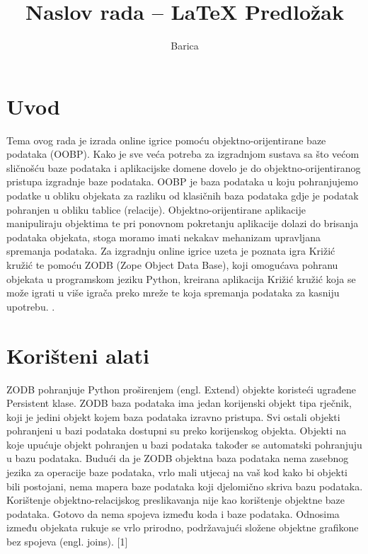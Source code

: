 \documentclass[]{foi} %
\title{Naslov rada -- LaTeX Predložak}
\author{Barica} %
\begin{document}
\maketitle

\tableofcontents

\makeatletter {} \makeatother
\pagestyle{plain}



\chapter{Uvod}

Tema ovog rada je izrada online igrice pomoću objektno-orijentirane baze podataka (OOBP). Kako je sve veća potreba za izgradnjom sustava sa što većom sličnošću baze podataka i aplikacijske domene dovelo je do objektno-orijentiranog pristupa izgradnje baze podataka. OOBP je baza podataka u koju pohranjujemo podatke u obliku objekata za razliku od klasičnih baza podataka gdje je podatak pohranjen u obliku tablice (relacije). Objektno-orijentirane aplikacije manipuliraju objektima te pri ponovnom pokretanju aplikacije dolazi do brisanja podataka objekata, stoga moramo imati nekakav mehanizam upravljana spremanja podataka. Za izgradnju online igrice uzeta je poznata igra Križić kružić te pomoću ZODB (Zope Object Data Base), koji omogućava pohranu objekata u programskom jeziku Python, kreirana aplikacija Križić kružić koja se može igrati u više igrača preko mreže te koja spremanja podataka za kasniju upotrebu. 
.



\chapter{Korišteni alati}

ZODB pohranjuje Python proširenjem (engl. Extend) objekte koristeći ugrađene Persistent klase. ZODB baza podataka ima jedan korijenski objekt tipa rječnik, koji je jedini objekt kojem baza podataka izravno pristupa. Svi ostali objekti pohranjeni u bazi podataka dostupni su preko korijenskog objekta. Objekti na koje upućuje objekt pohranjen u bazi podataka također se automatski pohranjuju u bazu podataka. Budući da je ZODB objektna baza podataka nema zasebnog jezika za operacije baze podataka, vrlo mali utjecaj na vaš kod kako bi objekti bili postojani, nema mapera baze podataka koji djelomično skriva bazu podataka. Korištenje objektno-relacijskog preslikavanja nije kao korištenje objektne baze podataka. Gotovo da nema spojeva između koda i baze podataka. Odnosima između objekata rukuje se vrlo prirodno, podržavajući složene objektne grafikone bez spojeva (engl. joins). [1]
\end{document}
